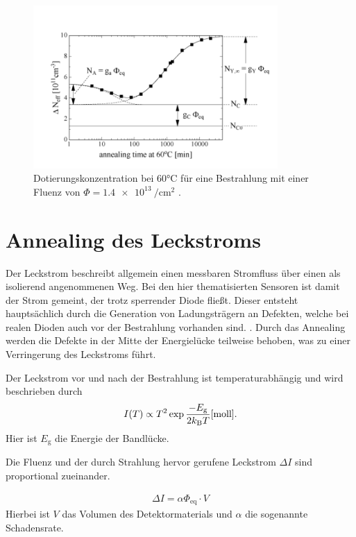 \begin{figure}
  \includegraphics[width=0.83\textwidth]{logos/n_eff_beispiel.PNG}
  \caption{Dotierungskonzentration bei 60°C für eine Bestrahlung mit einer Fluenz
  von $\Phi=\SI{1.4e13}{\per\centi\meter\squared}$ .\cite{moll}}
  \label{fig:n_eff_beispiel}
\end{figure}



\section{Annealing des Leckstroms}
Der Leckstrom beschreibt allgemein einen messbaren Stromfluss über einen als isolierend
angenommenen Weg. Bei den hier thematisierten Sensoren ist damit der Strom gemeint, der trotz sperrender
Diode fließt. Dieser entsteht hauptsächlich durch die Generation von Ladungsträgern an Defekten, welche
bei realen Dioden auch vor der Bestrahlung vorhanden sind. \cite{moll}.
Durch das Annealing werden die Defekte in der Mitte der Energielücke teilweise behoben,
was zu einer Verringerung des Leckstroms führt.

Der Leckstrom vor und nach der Bestrahlung ist temperaturabhängig und wird
beschrieben durch
\begin{align}
  I(T) \propto T^2 \exp{\frac{-E_{\mathrm{g}}}{2 k_{\mathrm{B}}T}} \text{\cite{moll}} \label{eqn:Chilingarov_2013}.
\end{align}
Hier ist $E_{\mathrm{g}}$ die Energie der Bandlücke.

Die Fluenz und der durch Strahlung hervor gerufene Leckstrom $\Delta I$ sind
proportional zueinander.


\begin{align}
  \Delta I = \alpha \Phi_{\mathrm{eq}} \cdot V
\end{align}
Hierbei ist $V$ das Volumen des Detektormaterials und $\alpha$ die
sogenannte Schadensrate.



